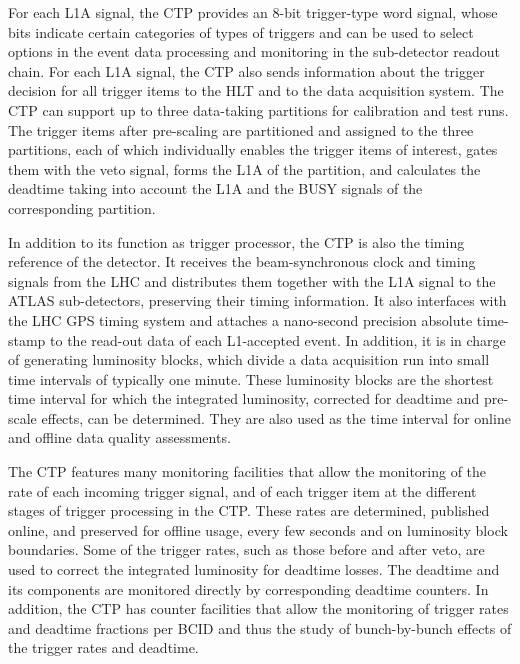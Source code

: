 \documentclass[cernpreprint, atlasdraft=false, UKenglish,british,orcidlogo, texmf, orcidlogo]{atlasdoc}
\begin{document}
For each \gls{L1A} signal, the \gls{CTP} provides an 8-bit trigger-type word signal, whose bits indicate certain categories of types of triggers and can be used to select options in the event data processing and monitoring in the sub-detector readout chain.  For each \gls{L1A} signal, the \gls{CTP} also sends information about the trigger decision for all trigger items to the \gls{HLT} and to the data acquisition system.  The \gls{CTP} can support up to three data-taking partitions for calibration and test runs.  The trigger items after pre-scaling are partitioned and assigned to the three partitions, each of which individually enables the trigger items of interest, gates them with the veto signal, forms the \gls{L1A} of the partition, and calculates the deadtime taking into account the \gls{L1A} and the BUSY signals of the corresponding partition.
 
In addition to its function as trigger processor, the \gls{CTP} is also the timing reference of the detector.  It receives the beam-synchronous clock and timing signals from the \gls{LHC} and distributes them together with the \gls{L1A} signal to the ATLAS sub-detectors, preserving their timing information.  It also interfaces with the \gls{LHC} \gls{GPS} timing system and attaches a nano-second precision absolute time-stamp to the read-out data of each \gls{L1}-accepted event.  In addition, it is in charge of generating luminosity blocks, which divide a data acquisition run into small time intervals of typically one minute.  These luminosity blocks are the shortest time interval for which the integrated luminosity, corrected for deadtime and pre-scale effects, can be determined.  They are also used as the time interval for online and offline data quality assessments.
 
The \gls{CTP} features many monitoring facilities that allow the monitoring of the rate of each incoming trigger signal, and of each trigger item at the different stages of trigger processing in the \gls{CTP}.  These rates are determined, published online, and preserved for offline usage, every few seconds and on luminosity block boundaries.  Some of the trigger rates, such as those before and after veto, are used to correct the integrated luminosity for deadtime losses.  The deadtime and its components are monitored directly by corresponding deadtime counters.  In addition, the \gls{CTP} has counter facilities that allow the monitoring of trigger rates and deadtime fractions per \gls{BCID} and thus the study of bunch-by-bunch effects of the trigger rates and deadtime.
 
\end{document}
